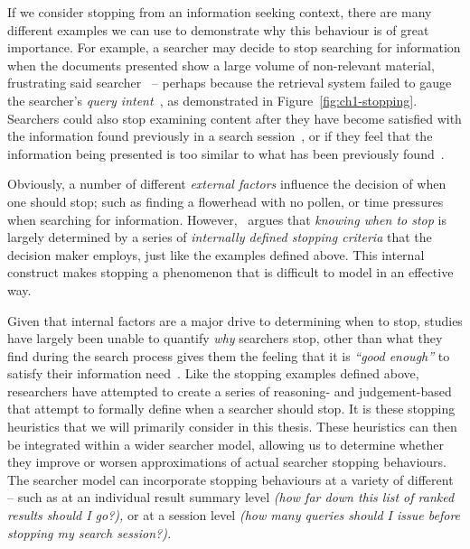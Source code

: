 If we consider stopping from an information seeking context, there are many different examples we can use to demonstrate why this behaviour is of great importance. For example, a searcher may decide to stop searching for information when the documents presented show a large volume of non-relevant material, frustrating said searcher~\citep{cooper1973retrieval_effectiveness_ii} -- perhaps because the retrieval system failed to gauge the searcher's \emph{query intent}~\citep{ashkan2009classifying}, as demonstrated in Figure~\ref{fig:ch1-stopping}. Searchers could also stop examining content after they have become satisfied with the information found previously in a search session~\citep{cooper1973retrieval_effectiveness, gibb1958number_rule, simon1955satiation}, or if they feel that the information being presented is too similar to what has been previously found~\citep{nickles1995judgment}.

Obviously, a number of different \emph{external factors} influence the decision of when one should stop; such as finding a flowerhead with no pollen, or time pressures when searching for information. However,~\cite{nickles1995judgment} argues that \emph{knowing when to stop} is largely determined by a series of \emph{internally defined stopping criteria} that the decision maker employs, just like the examples defined above. This internal construct makes stopping a phenomenon that is difficult to model in an effective way.

Given that internal factors are a major drive to determining when to stop, studies have largely been unable to quantify \emph{why} searchers stop, other than what they find during the search process gives them the feeling that it is \emph{``good enough''} to satisfy their information need~\citep{zach2005enough_is_enough}. Like the stopping examples defined above, researchers have attempted to create a series of reasoning- and judgement-based  that attempt to formally define when a searcher should stop. It is these stopping heuristics that we will primarily consider in this thesis. These heuristics can then be integrated within a wider searcher model, allowing us to determine whether they improve or worsen approximations of actual searcher stopping behaviours. The searcher model can incorporate stopping behaviours at a variety of different  -- such as at an individual result summary level \emph{(how far down this list of ranked results should I go?),} or at a session level \emph{(how many queries should I issue before stopping my search session?).}

